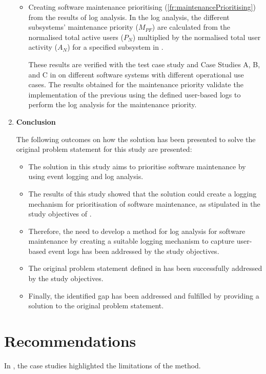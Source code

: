 \begin{enumerate}[label=\textbf{\Roman*.}]
\begin{itemize}
		\item Creating software maintenance prioritising (\ref{fr:maintenancePrioritising}) from the results of log analysis. In the log analysis, the different subsystems' maintenance priority ($M_{PF}$) are calculated from the normalised total active users ($P_N$) multiplied by the normalised total user activity ($A_N$) for a specified subsystem in . \par These results are verified with the test case study and Case Studies A, B, and C in  on different software systems with different operational use cases. The results obtained for the maintenance priority validate the implementation of the previous using the defined user-based logs to perform the log analysis for the maintenance priority. 
	\end{itemize}

	\clearpage

\item \textbf{Conclusion} \par The following outcomes on how the solution has been presented to solve the original problem statement for this study are presented:
	\begin{itemize}
		\item The solution in this study aims to prioritise software maintenance by using event logging and log analysis.
		\item The results of this study showed that the solution could create a logging mechanism for prioritisation of software maintenance, as stipulated in the study objectives of .
		\item Therefore, the need to develop a method for log analysis for software maintenance by creating a suitable logging mechanism to capture user-based event logs has been addressed by the study objectives.
		\item The original problem statement defined in  has been successfully addressed by the study objectives.
		\item Finally, the identified gap has been addressed and fulfilled by providing a solution to the original problem statement.
	\end{itemize}
\end{enumerate}

\section{Recommendations}
In , the case studies highlighted the limitations of the method. 

